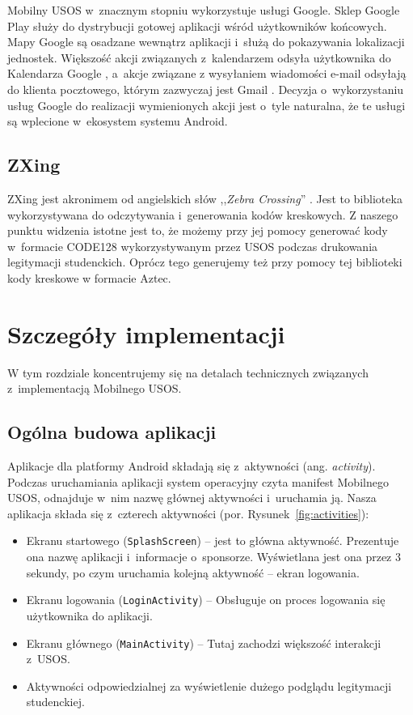 \documentclass{pracamgr}
\begin{document}
Mobilny USOS w~znacznym stopniu wykorzystuje usługi Google. Sklep Google Play
\cite{googleplay} służy do dystrybucji gotowej aplikacji wśród użytkowników
końcowych. Mapy Google \cite{googlemaps} są osadzane wewnątrz aplikacji i~służą
do pokazywania lokalizacji jednostek. Większość akcji związanych z~kalendarzem
odsyła użytkownika do Kalendarza Google \cite{googlecalendar}, a~akcje związane
z wysyłaniem wiadomości e-mail odsyłają do klienta pocztowego, którym zazwyczaj
jest Gmail \cite{gmail}. Decyzja o~wykorzystaniu usług Google do realizacji
wymienionych akcji jest o~tyle naturalna, że te usługi są wplecione w~ekosystem
systemu Android.

\section{ZXing}

ZXing jest akronimem od angielskich słów ,,\textit{Zebra Crossing}'' \cite{zxing}.
Jest to biblioteka wykorzystywana do odczytywania i~generowania kodów kreskowych.
Z naszego punktu widzenia istotne jest to, że możemy przy jej pomocy generować
kody w~formacie CODE128 wykorzystywanym przez USOS podczas drukowania legitymacji
studenckich. Oprócz tego generujemy też przy pomocy tej biblioteki kody kreskowe
w formacie Aztec.

\chapter{Szczegóły implementacji}
\label{sec:implementacja}

W tym rozdziale koncentrujemy się na detalach technicznych związanych z~implementacją
Mobilnego USOS.

\section{Ogólna budowa aplikacji}

Aplikacje dla platformy Android składają się z~aktywności (ang. \textit{activity}).
Podczas uruchamiania aplikacji system operacyjny czyta manifest Mobilnego USOS,
odnajduje w~nim nazwę głównej aktywności i~uruchamia ją. Nasza aplikacja składa
się z~czterech aktywności (por. Rysunek~\ref{fig:activities}):

\begin{itemize}
	\item Ekranu startowego (\texttt{SplashScreen}) -- jest to główna aktywność.
	      Prezentuje ona nazwę aplikacji i~informacje o~sponsorze. Wyświetlana
	      jest ona przez 3 sekundy, po czym uruchamia kolejną aktywność -- ekran
	      logowania.
	\item Ekranu logowania (\texttt{LoginActivity}) -- Obsługuje on proces logowania się
	      użytkownika do aplikacji.
	\item Ekranu głównego (\texttt{MainActivity}) -- Tutaj zachodzi większość interakcji
	      z~USOS.
	\item Aktywności odpowiedzialnej za wyświetlenie dużego podglądu legitymacji
	      studenckiej.
\end{itemize}
\end{document}
